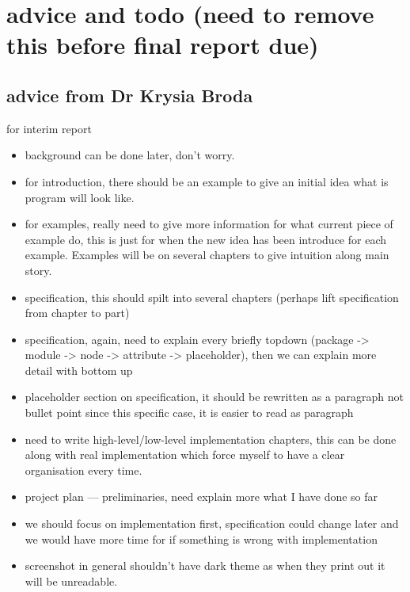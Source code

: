 \documentclass[master.tex]{subfiles}
\begin{document}
\section{advice and todo (need to remove this before final report due)}
\subsection{advice from Dr Krysia Broda}
for interim report
\begin{itemize}
  \item background can be done later, don't worry.
  \item for introduction, there should be an example to give an initial idea
    what is program will look like.
  \item for examples, really need to give more information for what current
    piece of example do, this is just for when the new idea has been introduce
    for each example. Examples will be on several chapters to give intuition
    along main story.
  \item specification, this should spilt into several chapters (perhaps lift
    specification from chapter to part)
  \item specification, again, need to explain every briefly topdown (package ->
    module -> node -> attribute -> placeholder),  then we can explain more
    detail with bottom up
  \item placeholder section on specification, it should be rewritten as a
    paragraph not bullet point since this specific case, it is easier to read
    as paragraph
  \item need to write high-level/low-level implementation chapters, this can be
    done along with real implementation which force myself to have a clear
    organisation every time.
  \item project plan --- preliminaries, need explain more what I have done so
    far
  \item we should focus on implementation first, specification could change
    later and we would have more time for if something is wrong with
    implementation
  \item screenshot in general shouldn't have dark theme as when they print out
    it will be unreadable.
\end{itemize}
\end{document}
